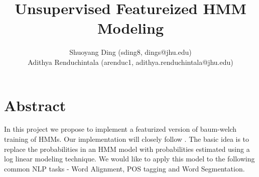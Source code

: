 \documentclass[11pt]{article}
\begin{document}
\title{Unsupervised Featureized HMM Modeling}

\author{Shuoyang Ding (sding8, dings@jhu.edu) \\ Adithya Renduchintala (arenduc1, adithya.renduchintala@jhu.edu)}


\maketitle

\section{Abstract}
In this project we propose to implement a featurized version of baum-welch training of HMMs. Our implementation will closely follow \cite{berg2010painless}. The basic idea is to replace the probabilities in an HMM model with probabilities estimated using a log linear modeling technique. We would like to apply this model to the following common NLP tasks - Word Alignment, POS tagging and Word Segmentation.
\end{document}
